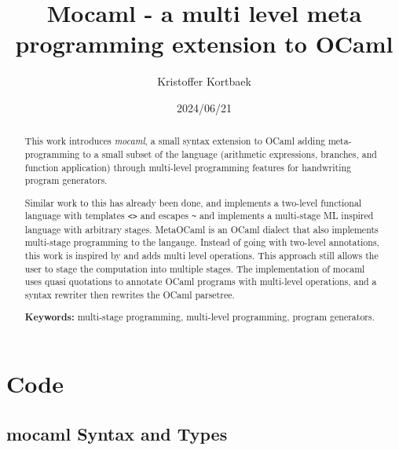 \documentclass[a4paper, 12pt]{article}
\title{Mocaml - a multi level meta programming extension to OCaml}
\author{Kristoffer Kortbaek}
\date{2024/06/21}
\begin{document}
\maketitle

\begin{abstract}
This work introduces \textit{mocaml}, a small syntax extension to OCaml adding meta-programming to a small subset of the language (arithmetic expressions, branches, and function application) through multi-level programming features for handwriting program generators.

Similar work to this has already been done, and \cite{two-stage} implements a two-level functional language with templates \texttt{<>} and escapes \texttt{\~} and \cite{metaML} implements a multi-stage ML inspired language with arbitrary stages. MetaOCaml is an OCaml dialect that also implements multi-stage programming to the langauge. Instead of going with two-level annotations, this work is inspired by \cite{multilevel} and adds multi level operations. This approach still allows the user to stage the computation into multiple stages.
The implementation of mocaml uses quasi quotations to annotate OCaml programs with multi-level operations, and a syntax rewriter then rewrites the OCaml parsetree.

\textbf{Keywords:} multi-stage programming, multi-level programming, program generators.
\end{abstract}

\tableofcontents

\clearpage







\clearpage

\clearpage
\appendix

\section{Code}

\subsection{mocaml Syntax and Types}

\inputminted{ocaml}{/Users/kristofferkortbaek/src/PAT_project/mocaml/lib/multi_level_ops.ml}
\end{document}
